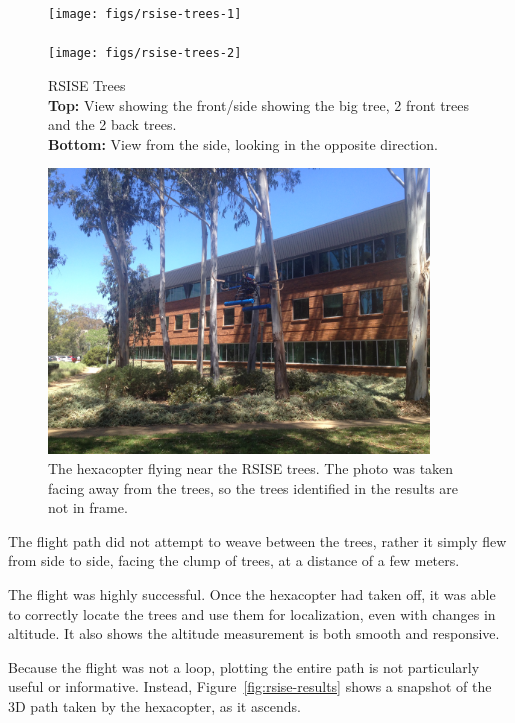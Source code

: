 \documentclass[12pt,oneside,a4paper,draft]{book}
\begin{document}
\begin{figure}
  \centering
  \texttt{[image: figs/rsise-trees-1]}\\
  ~\\
  \texttt{[image: figs/rsise-trees-2]}
  \caption{RSISE Trees\\\textbf{Top:} View showing the front/side
    showing the big tree, 2 front trees
    and the 2 back trees.\\\textbf{Bottom:} View from the side, looking
  in the opposite direction.}
  \label{fig:rsise-trees}
\end{figure}

\begin{figure}
  \centering
  \includegraphics[width=0.9\textwidth]{figs/rsise-flying}
  \caption{The hexacopter flying near the RSISE trees. The photo was
    taken facing away from the trees, so the trees identified in the
    results are not in frame.}
  \label{fig:rsise-flying}
\end{figure}

The flight path did not attempt to weave between the trees, rather it
simply flew from side to side, facing the clump of trees, at a
distance of a few meters.

The flight was highly successful. Once the hexacopter had taken off,
it was able to correctly locate the trees and use them for
localization, even with changes in altitude. It also shows the
altitude measurement is both smooth and responsive.

Because the flight was not a loop, plotting the entire path is not
particularly useful or informative. Instead,
Figure~\ref{fig:rsise-results} shows a snapshot of the 3D path taken by
the hexacopter, as it ascends.
\end{document}
